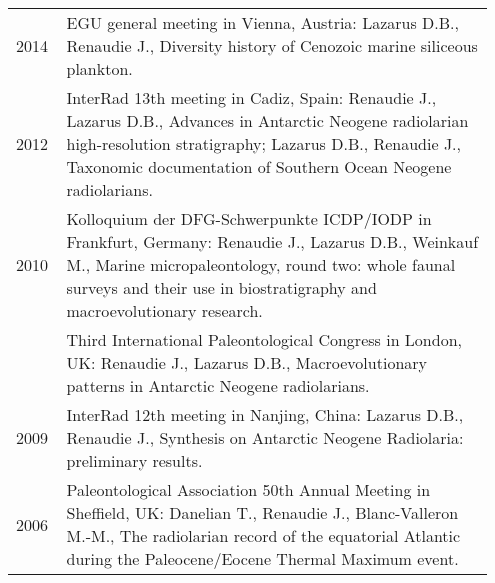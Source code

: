 \documentclass[11pt, a4paper]{article}
\begin{document}
\begin{longtable}{p{0.1\linewidth} P{0.85\linewidth}}
2014 %
 & EGU general meeting in Vienna, Austria: Lazarus D.B., Renaudie J., Diversity history of Cenozoic marine siliceous plankton.\\
2012 %
 & InterRad 13th meeting in Cadiz, Spain: Renaudie J., Lazarus D.B., Advances in Antarctic Neogene radiolarian high-resolution stratigraphy; Lazarus D.B., Renaudie J., Taxonomic documentation of Southern Ocean Neogene radiolarians.\\
2010 & Kolloquium der DFG-Schwerpunkte ICDP/IODP in Frankfurt, Germany: Renaudie J., Lazarus D.B., Weinkauf M., Marine micropaleontology, round two: whole faunal surveys and their use in biostratigraphy and macroevolutionary research.\\
 & Third International Paleontological Congress in London, UK: Renaudie J., Lazarus D.B., Macroevolutionary patterns in Antarctic Neogene radiolarians.\\
2009 %
 & InterRad 12th meeting in Nanjing, China: Lazarus D.B., Renaudie J., Synthesis on Antarctic Neogene Radiolaria: preliminary results.\\
2006 & Paleontological Association 50th Annual Meeting in Sheffield, UK: Danelian T., Renaudie J., Blanc-Valleron M.-M., The radiolarian record of the equatorial Atlantic during the Paleocene/Eocene Thermal Maximum event.\\
\end{longtable}
\end{document}

